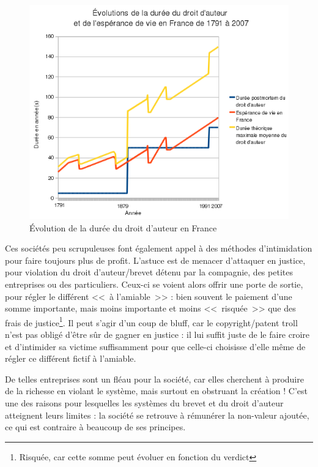 \begin{figure}[H]
\center
\includegraphics[width=\textwidth]{images/duree_du_droit_d'auteur_en_France_depuis_1791.png}
\caption{Évolution de la durée du droit d'auteur en France}
\end{figure}

Ces sociétés peu scrupuleuses font également appel à des méthodes d'intimidation pour faire toujours plus de profit.
L'astuce est de menacer d'attaquer en justice, pour violation du droit d'auteur/brevet détenu par la compagnie, des petites entreprises ou des particuliers.
Ceux-ci se voient alors offrir une porte de sortie, pour régler le différent <<~à l'amiable~>> : bien souvent le paiement d'une somme importante, mais moins importante et moins <<~risquée~>> que des frais de justice\footnote{Risquée, car cette somme peut évoluer en fonction du verdict}.
Il peut s'agir d'un coup de bluff, car le copyright/patent troll n'est pas obligé d'être sûr de gagner en justice : il lui suffit juste de le faire croire et d'intimider sa victime suffisamment pour que celle-ci choisisse d'elle même de régler ce différent fictif à l'amiable.

De telles entreprises sont un fléau pour la société, car elles cherchent à produire de la richesse en violant le système, mais surtout en obstruant la création !
C'est une des raisons pour lesquelles les systèmes du brevet et du droit d'auteur atteignent leurs limites : la société se retrouve à rémunérer la non-valeur ajoutée, ce qui est contraire à beaucoup de ses principes.

